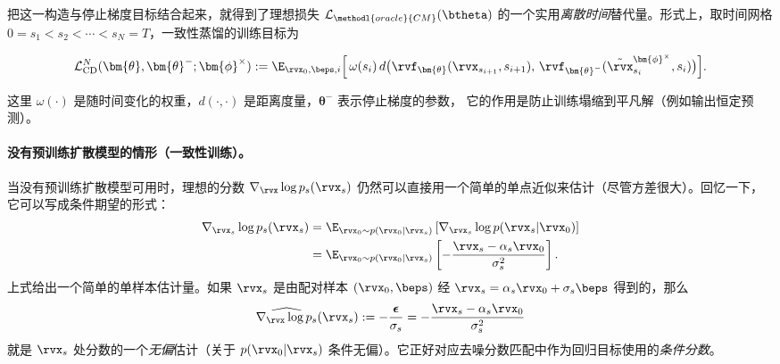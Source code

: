 把这一构造与停止梯度目标结合起来，就得到了理想损失 $\mathcal{L}_{\methodl{oracle}{CM}}(\btheta)$ 的一个实用\emph{离散时间}替代量。形式上，取时间网格 $0 = s_1 < s_2 < \cdots < s_N = T$，一致性蒸馏的训练目标为
\begin{mdframed}
\begin{align}\label{eq:cd-discrete-approx-N}
    \mathcal{L}_{\text{CD}}^N(\bm{\theta}, \bm{\theta}^-; \bm{\phi}^\times)
    := \E_{\rvx_0, \beps, i} \Big[\, \omega(s_i)\,
    d\big(\rvf_{\bm{\theta}}(\rvx_{s_{i+1}}, s_{i+1}),\,
          \rvf_{\bm{\theta}^-}(\tilde{\rvx}_{s_i}^{\bm{\phi}^\times}, s_i)\big)\Big].
\end{align}
\end{mdframed}
这里 $\omega(\cdot)$ 是随时间变化的权重，$d(\cdot,\cdot)$ 是距离度量，$\bm{\theta}^-$ 表示停止梯度的参数，
它的作用是防止训练塌缩到平凡解（例如输出恒定预测）。


\paragraph{没有预训练扩散模型的情形（一致性训练）。}
当没有预训练扩散模型可用时，理想的分数 $\nabla_{\rvx}\log p_s(\rvx_s)$ 仍然可以直接用一个简单的单点近似来估计（尽管方差很大）。回忆一下，它可以写成条件期望的形式：
\begin{align*}
    \nabla_{\rvx_s} \log p_s(\rvx_s)
    &= \E_{\rvx_0 \sim p(\rvx_0|\rvx_s)} \left[ \nabla_{\rvx_s}\log p(\rvx_s|\rvx_0) \right] \\
    &= \E_{\rvx_0 \sim p(\rvx_0|\rvx_s)} \left[ -\frac{\rvx_s - \alpha_s \rvx_0}{\sigma_s^2} \right].
\end{align*}
上式给出一个简单的单样本估计量。如果 $\rvx_s$ 是由配对样本 $(\rvx_0,\beps)$ 经 $\rvx_s = \alpha_s \rvx_0 + \sigma_s \beps$ 得到的，那么
\[
\widehat{\nabla_{\rvx}\log p_s}(\rvx_s)
:=-\frac{\boldsymbol\epsilon}{\sigma_s}
=-\frac{\rvx_s-\alpha_s \rvx_0}{\sigma_s^2}
\]
就是 $\rvx_s$ 处分数的一个\emph{无偏}估计（关于 $p(\rvx_0|\rvx_s)$ 条件无偏）。它正好对应去噪分数匹配中作为回归目标使用的\emph{条件分数}。


